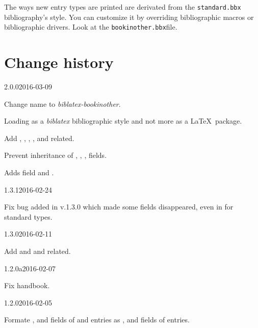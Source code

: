 \documentclass{ltxdockit}[2011/03/25]
\newcommand{\biblatex}{\emph{biblatex}\xspace}
\begin{document}
The ways new entry types are printed are derivated from the \verb+standard.bbx+ bibliography's style. You can customize it by overriding bibliographic macros or bibliographic drivers. Look at the \verb+bookinother.bbx+file.

\section{Change history}


\begin{changelog}

\begin{release}{2.0.0}{2016-03-09}
\item Change name to \emph{biblatex-bookinother}.
\item Loading as a \biblatex bibliographic style and not more as a \LaTeX\ package.
\item Add , , , ,  and related.
\item Prevent inheritance of , , ,  fields.
\item Adds field  and .
\end{release}

\begin{release}{1.3.1}{2016-02-24}
\item Fix bug added in v.1.3.0 which made some fields disappeared, even in for standard types.
\end{release}

\begin{release}{1.3.0}{2016-02-11}
\item Add  and  and related.
\end{release}

\begin{release}{1.2.0a}{2016-02-07}
\item Fix handbook.
\end{release}

\begin{release}{1.2.0}{2016-02-05}
\item Formate   ,  and  fields of   and  entries as ,  and  fields of  entries.
\end{release}


\end{changelog}
\end{document}
